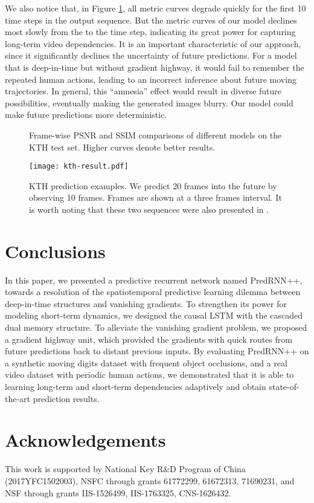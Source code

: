\documentclass{article}
\begin{document}
We also notice that, in Figure \ref{fig:kth_frame}, all metric curves degrade quickly for the first 10 time steps in the output sequence. But the metric curves of our model declines most slowly from the  to the  time step, indicating its great power for capturing long-term video dependencies. It is an important characteristic of our approach, since it significantly declines the uncertainty of future predictions. For a model that is deep-in-time but without gradient highway, it would fail to remember the repeated human actions, leading to an incorrect inference about future moving trajectories. In general, this ``amnesia'' effect would result in diverse future possibilities, eventually making the generated images blurry. Our model could make future predictions more deterministic.




\begin{figure}[htb]
\vskip 0.15in
\centering
{}
\caption{Frame-wise PSNR and SSIM comparisons of different models on the KTH test set. Higher curves denote better results.}
\label{fig:kth_frame}
\end{figure}



\begin{figure}[htb]
\vskip 0.15in
\centering
\texttt{[image: kth-result.pdf]}
\caption{KTH prediction examples. We predict 20 frames into the future by observing 10 frames. Frames are shown at a three frames interval. It is worth noting that these two sequences were also presented in \cite{Villegas2017Decomposing}.}
\label{fig:kth_results}
\end{figure} 


\section{Conclusions}

In this paper, we presented a predictive recurrent network named PredRNN++, towards a resolution of the spatiotemporal predictive learning dilemma between deep-in-time structures and vanishing gradients. To strengthen its power for modeling short-term dynamics, we designed the causal LSTM with the cascaded dual memory structure. To alleviate the vanishing gradient problem, we proposed a gradient highway unit, which provided the gradients with quick routes from future predictions back to distant previous inputs. By evaluating PredRNN++ on a synthetic moving digits dataset with frequent object occlusions, and a real video dataset with periodic human actions, we demonstrated that it is able to learning long-term and short-term dependencies adaptively and obtain state-of-the-art prediction results.

\section{Acknowledgements}
This work is supported by National Key R\&D Program of China (2017YFC1502003), NSFC through grants 61772299, 61672313, 71690231, and NSF through grants IIS-1526499, IIS-1763325, CNS-1626432.

\nocite{langley00}



\end{document}
